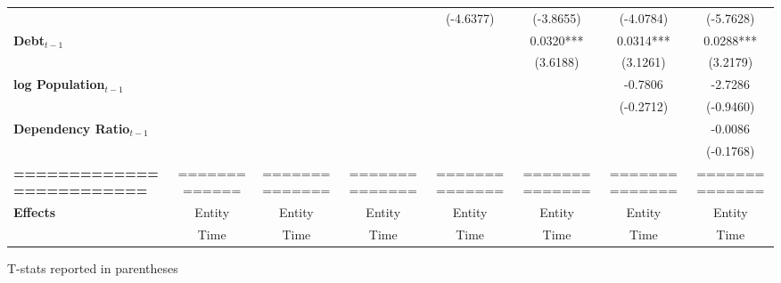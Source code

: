 \begin{center}
\begin{tabular}{lccccccc}
\textbf{ }                         &                   &                      &                           &     (-4.6377)      &    (-3.8655)    &         (-4.0784)         &          (-5.7628)            \\
\textbf{Debt$_{t-1}$}                &                   &                      &                           &                    &    0.0320***    &         0.0314***         &          0.0288***            \\
\textbf{ }                         &                   &                      &                           &                    &     (3.6188)    &          (3.1261)         &           (3.2179)            \\
\textbf{log Population$_{t-1}$}      &                   &                      &                           &                    &                 &          -0.7806          &           -2.7286             \\
\textbf{ }                         &                   &                      &                           &                    &                 &         (-0.2712)         &          (-0.9460)            \\
\textbf{Dependency Ratio$_{t-1}$}   &                   &                      &                           &                    &                 &                           &           -0.0086             \\
\textbf{ }                         &                   &                      &                           &                    &                 &                           &          (-0.1768)            \\
\textbf{=========================} &   =============   &    ==============    &       ==============      &   ==============   &  ============== &       ==============      &        ==============         \\
\textbf{Effects}                   &       Entity      &        Entity        &           Entity          &       Entity       &      Entity     &           Entity          &            Entity             \\
\textbf{}                          &        Time       &         Time         &            Time           &        Time        &       Time      &            Time           &             Time              \\
\bottomrule
\end{tabular}
\end{center}

T-stats reported in parentheses
